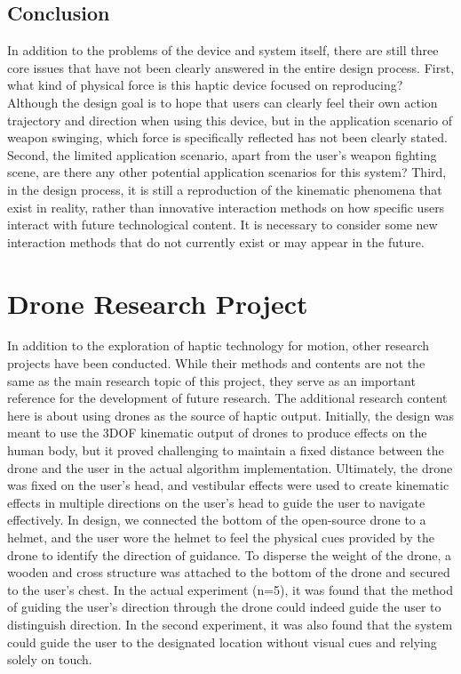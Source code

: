 \subsection{Conclusion}
In addition to the problems of the device and system itself, there are still three core issues that have not been clearly answered in the entire design process. First, what kind of physical force is this haptic device focused on reproducing? Although the design goal is to hope that users can clearly feel their own action trajectory and direction when using this device, but in the application scenario of weapon swinging, which force is specifically reflected has not been clearly stated. 
Second, the limited application scenario, apart from the user's weapon fighting scene, are there any other potential application scenarios for this system? 
Third, in the design process, it is still a reproduction of the kinematic phenomena that exist in reality, rather than innovative interaction methods on how specific users interact with future technological content. It is necessary to consider some new interaction methods that do not currently exist or may appear in the future.

\section{Drone Research Project}
In addition to the exploration of haptic technology for motion, other research projects have been conducted. While their methods and contents are not the same as the main research topic of this project, they serve as an important reference for the development of future research.
The additional research content here is about using drones as the source of haptic output. Initially, the design was meant to use the 3DOF kinematic output of drones to produce effects on the human body, but it proved challenging to maintain a fixed distance between the drone and the user in the actual algorithm implementation. Ultimately, the drone was fixed on the user's head, and vestibular effects were used to create kinematic effects in multiple directions on the user's head to guide the user to navigate effectively.
In design, we connected the bottom of the open-source drone to a helmet, and the user wore the helmet to feel the physical cues provided by the drone to identify the direction of guidance. To disperse the weight of the drone, a wooden and cross structure was attached to the bottom of the drone and secured to the user's chest.
In the actual experiment (n=5), it was found that the method of guiding the user's direction through the drone could indeed guide the user to distinguish direction. In the second experiment, it was also found that the system could guide the user to the designated location without visual cues and relying solely on touch.

